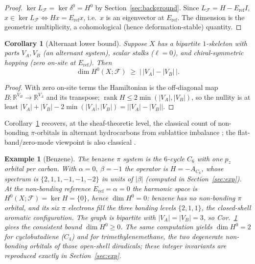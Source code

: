 \documentclass[pdflatex,sn-mathphys-num]{sn-jnl}%
\DeclareMathOperator{\rank}{rank}
\newcommand{\R}{\mathbb{R}}
\newcommand{\F}{\mathcal{F}}
\newcommand{\X}{X}
\theoremstyle{thmstyleone}
\newtheorem{corollary}[theorem]{Corollary}
\theoremstyle{thmstyletwo}
\newtheorem{example}[theorem]{Example}
\theoremstyle{thmstylethree}
\begin{document}
\begin{proof}
$\ker L_\F=\ker\delta^0=H^0$ by Section~\ref{sec:background}. Since
$L_\F=H-E_{\mathrm{ref}}I$, $x\in\ker L_\F \iff Hx=E_{\mathrm{ref}}x$, i.e.\ $x$ is
an eigenvector at $E_{\mathrm{ref}}$. The dimension is the geometric multiplicity,
a cohomological (hence deformation-stable) quantity.
\end{proof}

\begin{corollary}[Alternant lower bound]\label{cor:alternant}
Suppose $\X$ has a bipartite $1$-skeleton with parts $V_A,V_B$ (an alternant
system), scalar stalks ($\ell=0$), and chiral-symmetric hopping (zero on-site at
$E_{\mathrm{ref}}$). Then
\begin{equation}
\dim H^0(\X;\F)\;\ge\;\big|\,|V_A|-|V_B|\,\big| .
\end{equation}
\end{corollary}

\begin{proof}
With zero on-site terms the Hamiltonian is the off-diagonal map
$B:\R^{V_B}\to\R^{V_A}$ and its transpose; $\rank H \le 2\min(|V_A|,|V_B|)$, so the
nullity is at least $|V_A|+|V_B|-2\min(|V_A|,|V_B|)=\big||V_A|-|V_B|\big|$.
\end{proof}

Corollary~\ref{cor:alternant} recovers, at the sheaf-theoretic level, the
classical count of non-bonding $\pi$-orbitals in alternant hydrocarbons from
sublattice imbalance
\cite{longuethiggins1950};
the flat-band/zero-mode viewpoint is also classical \cite{sutherland1986,lieb1989}.

\begin{example}[Benzene]\label{ex:benzene}
The benzene $\pi$ system is the $6$-cycle $C_6$ with one $p_z$ orbital per carbon.
With $\alpha=0,\ \beta=-1$ the operator is $H=-A_{C_6}$, whose spectrum is
$\{2,1,1,-1,-1,-2\}$ in units of $|\beta|$ (computed in Section~\ref{sec:exp}). At
the non-bonding reference $E_{\mathrm{ref}}=\alpha=0$ the harmonic space is
$H^0(\X;\F)=\ker H=\{0\}$, hence $\dim H^0=0$: benzene has no non-bonding $\pi$
orbital, and its six $\pi$ electrons fill the three bonding levels $\{2,1,1\}$, the
closed-shell aromatic configuration. The graph is bipartite with $|V_A|=|V_B|=3$,
so Cor.~\ref{cor:alternant} gives the consistent bound $\dim H^0\ge 0$. The same
computation yields $\dim H^0=2$ for cyclobutadiene ($C_4$) and for
trimethylenemethane, the two degenerate non-bonding orbitals of those open-shell
diradicals; these integer invariants are reproduced exactly in
Section~\ref{sec:exp}.
\end{example}
\end{document}
